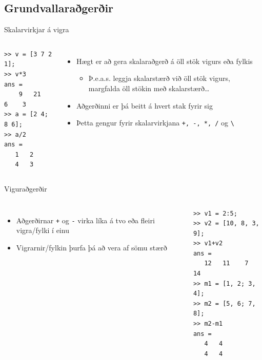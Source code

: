 \documentclass[handout]{beamer}
\begin{document}
\subsection{Grundvallaraðgerðir}

\begin{frame}[fragile]{Skalarvirkjar á vigra}
\begin{columns}
\begin{verbatim}
>> v = [3 7 2 1];
>> v*3
ans =
    9   21    6    3
>> a = [2 4; 8 6];
>> a/2
ans =
   1   2
   4   3
\end{verbatim}

\begin{itemize}
 \item Hægt er að gera skalaraðgerð á öll stök vigurs eða fylkis
 \begin{itemize}
  \item Þ.e.a.s. leggja skalarstærð við öll stök vigurs, margfalda öll stökin með skalarstærð\ldots
 \end{itemize}
 \item Aðgerðinni er þá beitt á hvert stak fyrir sig
 \item Þetta gengur fyrir skalarvirkjana \texttt{+, -, *, /} og \texttt{\textbackslash}
\end{itemize}
\end{columns}
\end{frame}

\begin{frame}[fragile]{Viguraðgerðir}
\begin{columns}
\begin{itemize}
 \item Aðgerðirnar \texttt{+} og \texttt{-} virka líka á tvo eða fleiri vigra/fylki í einu
 \item Vigrarnir/fylkin þurfa þá að vera af sömu stærð
\end{itemize}

\begin{verbatim}
>> v1 = 2:5;
>> v2 = [10, 8, 3, 9];
>> v1+v2
ans =
   12   11    7   14
>> m1 = [1, 2; 3, 4];
>> m2 = [5, 6; 7, 8];
>> m2-m1
ans =
   4   4
   4   4
\end{verbatim}
\end{columns}
\end{frame}
\end{document}
